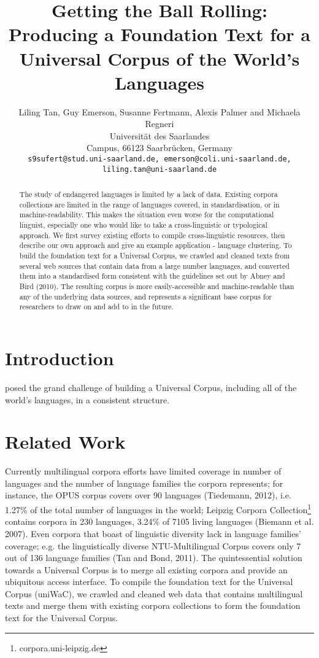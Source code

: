 \documentclass[11pt]{article}
\title{Getting the Ball Rolling: Producing a Foundation Text for a Universal Corpus of the World's Languages}
\author{Liling Tan, Guy Emerson, Susanne Fertmann, Alexis Palmer and Michaela Regneri \\
  Universit{\"a}t des Saarlandes \\
  Campus, 66123 Saarbr{\"u}cken, Germany \\
  {\tt s9sufert@stud.uni-saarland.de, emerson@coli.uni-saarland.de,} \\
  {\tt liling.tan@uni-saarland.de}}
\date{}
\begin{document}
\maketitle
\begin{abstract}
The study of endangered languages is limited by a lack of data. Existing corpora collections are limited in the range of languages covered, in standardisation, or in machine-readability. This makes the situation even worse for the computational linguist, especially one who would like to take a cross-linguistic or typological approach. We first survey existing efforts to compile cross-linguistic resources, then describe our own approach and give an example application - language clustering. To build the foundation text for a Universal Corpus, we crawled and cleaned texts from several web sources that contain data from a large number languages, and converted them into a standardised form consistent with the guidelines set out by Abney and Bird (2010). The resulting corpus is more easily-accessible and machine-readable than any of the underlying data sources, and represents a significant base corpus for researchers to draw on and add to in the future.
\end{abstract}

\section{Introduction}

 posed the grand challenge of building a Universal Corpus, including all of the world's languages, in a consistent structure.


\section{Related Work}

Currently multilingual corpora efforts have limited coverage in number of languages and the number of language families the corpora represents; for instance, the OPUS corpus covers over 90 languages (Tiedemann, 2012), i.e. 1.27\% of the total number of languages in the world; Leipzig Corpora
Collection\footnote{corpora.uni-leipzig.de} contains corpora in 230 languages, 3.24\% of 7105 living languages (Biemann et al. 2007). Even corpora that boast of linguistic diversity lack in language families’ coverage; e.g. the linguistically diverse NTU-Multilingual Corpus covers only 7 out of 136 language families (Tan and Bond, 2011). The quintessential solution towards a Universal Corpus is to merge all existing corpora and provide an ubiquitous access interface. To compile the foundation text for the Universal Corpus (uniWaC), we crawled and cleaned web data that contains multilingual texts and merge them with existing corpora collections to form the foundation text for the Universal Corpus.
\end{document}
